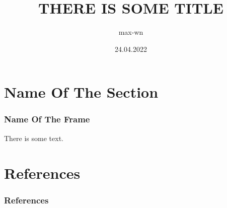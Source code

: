 
\title{THERE IS SOME TITLE}
\author{max-wn}
\date{24.04.2022}



\begin{frame}
\maketitle
\end{frame}

\section{Name Of The Section}

\begin{frame}
\frametitle{Name Of The Frame}

There is some text.

\end{frame}


\section{References}

\begin{frame}
\frametitle{References}
\printbibliography
\end{frame}


